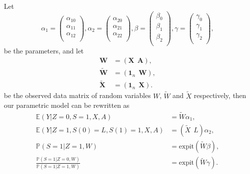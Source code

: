 \documentclass[article]{jss}
\def\expit{\mathrm{expit}}
\begin{document}
Let
\begin{equation}
  \alpha_1 = \left(
    \begin{array}{c}
      \alpha_{10}\\
      \alpha_{11}\\
      \alpha_{12}\\
    \end{array}
  \right),
  \alpha_2 = \left(
    \begin{array}{c}
      \alpha_{20}\\
      \alpha_{21}\\
      \alpha_{22}\\
    \end{array}
  \right),
  \beta = \left(
    \begin{array}{c}
      \beta_0\\
      \beta_1\\
      \beta_2\\
    \end{array}
  \right),
  \gamma = \left(
    \begin{array}{c}
      \gamma_0\\
      \gamma_1\\
      \gamma_2\\
    \end{array}
  \right),
\end{equation}
be the parameters, and let
\begin{equation}
  \begin{aligned}
  \mathbf{W} &= (\mathbf{X}~~\mathbf{A}),\\
  \widetilde{\mathbf{W}} &= (\mathbf{1}_n~~\mathbf{W}),\\
  \widetilde{\mathbf{X}}&=(\mathbf{1}_n~~\mathbf{X}).
  \end{aligned}
\end{equation}
be the observed data matrix of random variables $W$, $\widetilde{W}$ and $\widetilde{X}$ respectively, 
then our parametric model can be rewritten as
\begin{equation}
  \begin{aligned}
  \mathbb{E}(Y|Z=0,S=1,X,A)&=\widetilde{W}\alpha_1,\\
  \mathbb{E}(Y|Z=1,S(0)=L,S(1)=1,X,A)&=(\widetilde{X}~~L)\alpha_2,\\
  \mathbb{P}(S=1|Z=1,W) &= \expit(\widetilde{W}\beta),\\
  \frac{\mathbb{P}(S=1|Z=0,W)}{\mathbb{P}(S=1|Z=1,W)} &= \expit(\widetilde{W}\gamma).
  \end{aligned}
\end{equation}
\end{document}
